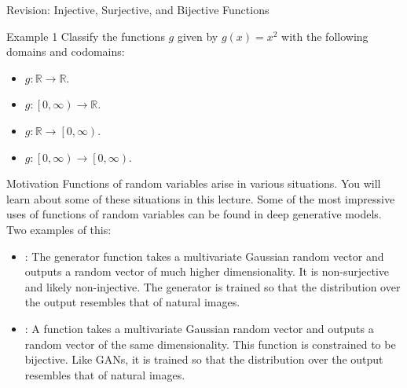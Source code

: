 \documentclass[10pt]{beamer}
\begin{document}
\begin{frame}[fragile]{Revision: Injective, Surjective, and Bijective Functions}
\begin{exampleblock}{Example 1}
Classify the functions \(g\) given by \(g\left(x\right) = x^2\) with the following domains and codomains:
\begin{itemize}
    \item \(g: \mathbb{R} \rightarrow \mathbb{R}\). 
    \item \(g: \left[0, \infty\right) \rightarrow \mathbb{R}\). 
    \item \(g: \mathbb{R} \rightarrow \left[0, \infty\right)\). 
    \item \(g: \left[0, \infty\right) \rightarrow \left[0, \infty\right)\). \onslide<5->{Injective and surjective, hence bijective. Bijectivity implies an inverse exists: \(g^{-1}\left(y\right) = \sqrt{y}\) with \(g^{-1}: \left[0, \infty\right) \rightarrow \left[0, \infty\right)\).}
\end{itemize}
\end{exampleblock}
\end{frame}

\begin{frame}[fragile]{Motivation}
Functions of random variables arise in various situations. You will learn about some of these situations in this lecture. Some of the most impressive uses of functions of random variables can be found in deep generative models. Two examples of this:
\begin{itemize}[<+->]
    \item \href{https://en.wikipedia.org/wiki/Generative_adversarial_network}{\color{mLightBrown}{Generative adversarial networks (GANs)}}: The generator function takes a multivariate Gaussian random vector and outputs a random vector of much higher dimensionality. It is non-surjective and likely non-injective. The generator is trained so that the distribution over the output resembles that of natural images.
    \item \href{https://en.wikipedia.org/wiki/Flow-based_generative_model}{\color{mLightBrown}{Normalising flows}}: A function takes a multivariate Gaussian random vector and outputs a random vector of the same dimensionality. This function is constrained to be bijective. Like GANs, it is trained so that the distribution over the output resembles that of natural images.
\end{itemize}
\end{frame}
\end{document}
